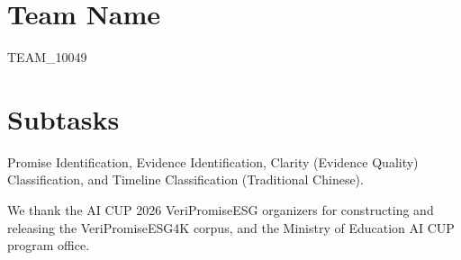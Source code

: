 \documentclass[sigconf,article]{acmart}
\begin{document}

\maketitle
\pagestyle{plain}

\section*{Team Name}
TEAM\_10049

\section*{Subtasks}
Promise Identification, Evidence Identification, Clarity (Evidence Quality) Classification,
and Timeline Classification (Traditional Chinese).












\begin{acks}
We thank the AI CUP 2026 VeriPromiseESG organizers for constructing and releasing the
VeriPromiseESG4K corpus, and the Ministry of Education AI CUP program office.
\end{acks}

\balance


\end{document}
